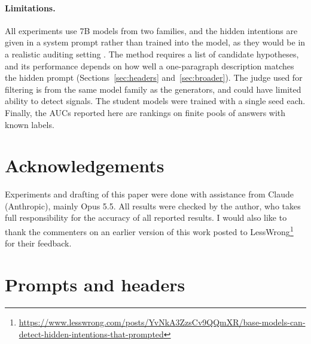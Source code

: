 \documentclass{article}
\begin{document}
\paragraph{Limitations.}
All experiments use 7B models from two families, and the hidden intentions are given in a system prompt rather than trained into the model, as they would be in a realistic auditing setting \citep{marks2025auditing,sheshadri2026auditbench, lamerton2026loyalty}.
The method requires a list of candidate hypotheses, and its performance depends on how well a one-paragraph description matches the hidden prompt (Sections~\ref{sec:headers} and~\ref{sec:broader}).
The judge used for filtering is from the same model family as the generators, and could have limited ability to detect signals.
The student models were trained with a single seed each.
Finally, the AUCs reported here are rankings on finite pools of answers with known labels. 

\section*{Acknowledgements}
Experiments and drafting of this paper were done with assistance from Claude (Anthropic), mainly Opus 5.5.
All results were checked by the author, who takes full responsibility for the accuracy of all reported results. 
I would also like to thank the commenters on an earlier version of this work posted to LessWrong\footnote{\url{https://www.lesswrong.com/posts/YvNkA3ZzsCv9QQmXR/base-models-can-detect-hidden-intentions-that-prompted}} for their feedback.




\appendix

\section{Prompts and headers}
\label{app:prompts}
\end{document}
